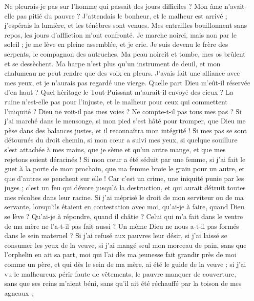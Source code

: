 \begin{multicols}{2}
Ne pleurais-je pas sur l'homme qui passait des jours difficiles ? Mon âme n'avait-elle pas pitié du pauvre ?
J'attendais le bonheur, et le malheur est arrivé ; j'espérais la lumière, et les ténèbres sont venues.
Mes entrailles bouillonnent sans repos, les jours d'affliction m'ont confronté.
Je marche noirci, mais non par le soleil ; je me lève en pleine assemblée, et je crie.
Je suis devenu le frère des serpents, le compagnon des autruches.
Ma peau noircit et tombe, mes os brûlent et se dessèchent.
Ma harpe n'est plus qu'un instrument de deuil, et mon chalumeau ne peut rendre que des voix en pleurs.
\VerseOne{}J'avais fait une alliance avec mes yeux, et je n'aurais pas regardé une vierge.
Quelle part Dieu m'eût-il réservée d'en haut ? Quel héritage le Tout-Puissant m’aurait-il envoyé des cieux ?
La ruine n'est-elle pas pour l'injuste, et le malheur pour ceux qui commettent l'iniquité ?
Dieu ne voit-il pas mes voies ? Ne compte-t-il pas tous mes pas ?
Si j'ai marché dans le mensonge, si mon pied s'est hâté pour tromper,
que Dieu me pèse dans des balances justes, et il reconnaîtra mon intégrité !
Si mes pas se sont détournés du droit chemin, si mon cœur a suivi mes yeux, si quelque souillure s'est attachée à mes mains,
que je sème et qu'un autre mange, et que mes rejetons soient déracinés !
Si mon cœur a été séduit par une femme, si j'ai fait le guet à la porte de mon prochain,
que ma femme broie le grain pour un autre, et que d'autres se penchent sur elle !
Car c'est un crime, une iniquité punie par les juges ;
c'est un feu qui dévore jusqu'à la destruction, et qui aurait détruit toutes mes récoltes dans leur racine.
Si j'ai méprisé le droit de mon serviteur ou de ma servante, lorsqu'ils étaient en contestation avec moi,
qu'ai-je à faire, quand Dieu se lève ? Qu'ai-je à répondre, quand il châtie ?
Celui qui m'a fait dans le ventre de ma mère ne l'a-t-il pas fait aussi ? Un même Dieu ne nous a-t-il pas formés dans le sein maternel ?
Si j'ai refusé aux pauvres leur désir, si j'ai laissé se consumer les yeux de la veuve,
si j'ai mangé seul mon morceau de pain, sans que l'orphelin en ait sa part,
moi qui l'ai dès ma jeunesse fait grandir près de moi comme un père, et qui dès le sein de ma mère, ai été le guide de la veuve ;
si j'ai vu le malheureux périr faute de vêtements, le pauvre manquer de couverture,
sans que ses reins m'aient béni, sans qu'il ait été réchauffé par la toison de mes agneaux ;

\end{multicols}
